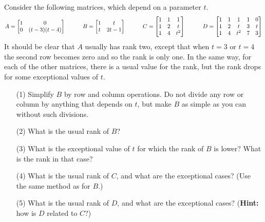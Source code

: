 \documentclass[a4paper]{amsart}
\begin{document}
\begin{exercise}\label{ex-rank-iii}
 Consider the following matrices, which depend on a parameter $t$. 
 \[ A = \left[\begin{matrix} 1 & 0 \\ 
             0 & (t-3)(t-4) \end{matrix}\right] \hspace{3em}
    B = \left[\begin{matrix} 1 & t \\
             t & 2t-1 \end{matrix}\right] \hspace{3em}
    C = \left[\begin{matrix} 1 & 1 & 1 \\
             1 & 2 & t \\
             1 & 4 & t^2 \end{matrix}\right] \hspace{3em}
    D = \left[\begin{matrix} 1 & 1 & 1   & 1 & 0 \\
             1 & 2 & t   & 3 & t \\
             1 & 4 & t^2 & 7 & 3 \end{matrix}\right]
 \]
 It should be clear that $A$ usually has rank two, except that when
 $t=3$ or $t=4$ the second row becomes zero and so the rank is only
 one.  In the same way, for each of the other matrices, there is a
 usual value for the rank, but the rank drops for some exceptional
 values of $t$.
 \begin{itemize}
  \item[(1)] Simplify $B$ by row and column operations.  Do not divide
   any row or column by anything that depends on $t$, but make $B$ as
   simple as you can without such divisions.
  \item[(2)] What is the usual rank of $B$?
  \item[(3)] What is the exceptional value of $t$ for which the rank
   of $B$ is lower?  What is the rank in that case?
  \item[(4)] What is the usual rank of $C$, and what are the
   exceptional cases?  (Use the same method as for $B$.)
  \item[(5)] What is the usual rank of $D$, and what are the
   exceptional cases?  (\textbf{Hint:} how is $D$ related to $C$?)
 \end{itemize}
\end{exercise}
\end{document}
